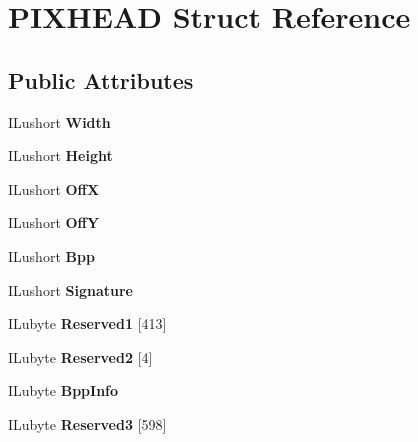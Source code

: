 \hypertarget{structPIXHEAD}{}\section{P\+I\+X\+H\+E\+AD Struct Reference}
\label{structPIXHEAD}
\subsection*{Public Attributes}
\begin{DoxyCompactItemize}
\item 
\mbox{\label{structPIXHEAD_a189fcc3decfd8f0c8f287dc2ac146aba}} 
I\+Lushort {\bfseries Width}
\item 
\mbox{\label{structPIXHEAD_a882a1b09d49f48f1f6dc0f04c98224c4}} 
I\+Lushort {\bfseries Height}
\item 
\mbox{\label{structPIXHEAD_a83c14ce416f1231a87d126517375d243}} 
I\+Lushort {\bfseries OffX}
\item 
\mbox{\label{structPIXHEAD_a32d9fd234253e076b320684c18d379a4}} 
I\+Lushort {\bfseries OffY}
\item 
\mbox{\label{structPIXHEAD_ae4b76478f5dc6ceebb2f9e5d1d754eb4}} 
I\+Lushort {\bfseries Bpp}
\item 
\mbox{\label{structPIXHEAD_ab2f5663030ae61d00259d1250c8e5a50}} 
I\+Lushort {\bfseries Signature}
\item 
\mbox{\label{structPIXHEAD_ac97790d9a20680af7d8200362626ec04}} 
I\+Lubyte {\bfseries Reserved1} \mbox{[}413\mbox{]}
\item 
\mbox{\label{structPIXHEAD_aa6ac55aae6e793f840cf73c2be46001d}} 
I\+Lubyte {\bfseries Reserved2} \mbox{[}4\mbox{]}
\item 
\mbox{\label{structPIXHEAD_ac8512f6b2facced43e2c0ca2de1ed0f6}} 
I\+Lubyte {\bfseries Bpp\+Info}
\item 
\mbox{\label{structPIXHEAD_a124cfa86118799e626efee3780a83aff}} 
I\+Lubyte {\bfseries Reserved3} \mbox{[}598\mbox{]}
\end{DoxyCompactItemize}



